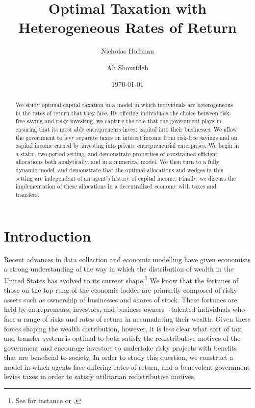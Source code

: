 \documentclass[11pt]{article}
\title{Optimal Taxation with Heterogeneous Rates of Return}
\author{
    Nicholas Hoffman\\
    \and 
    Ali Shourideh\\
}
\date{\today}
\begin{document}
\maketitle
\begin{abstract}
    We study optimal capital taxation in a model in which individuals are heterogeneous in the rates of return that they face. By offering individuals the choice between risk-free saving and risky investing, we capture the role that the government plays in ensuring that its most able entrepreneurs invest capital into their businesses. We allow the government to levy separate taxes on interest income from risk-free savings and on capital income earned by investing into private entrepreneurial enterprises. We begin in a static, two-period setting, and demonstrate properties of constrained-efficient allocations both analytically, and in a numerical model. We then turn to a fully dynamic model, and demonstrate that the optimal allocations and wedges in this setting are independent of an agent's history of capital income. Finally, we discuss the implementation of these allocations in a decentralized economy with taxes and transfers. 
\end{abstract}

\section{Introduction} \label{sec:intro}

Recent advances in data collection and economic modelling have given economists a strong understanding of the way in which the distribution of wealth in the United States has evolved to its current shape.\footnote{See for instance \cite{benhabib2011distribution} or \cite{benhabib2019wealth}.} We know that the fortunes of those on the top rung of the economic ladder are primarily composed of risky assets such as ownership of businesses and shares of stock. These fortunes are held by entrepreneurs, investors, and business owners---talented individuals who face a range of risks and rates of return in accumulating their wealth. Given these forces shaping the wealth distribution, however, it is less clear what sort of tax and transfer system is optimal to both satisfy the redistributive motives of the government and encourage investors to undertake risky projects with benefits that are beneficial to society. In order to study this question, we construct a model in which agents face differing rates of return, and a benevolent government levies taxes in order to satisfy utilitarian redistributive motives. 
\end{document}

